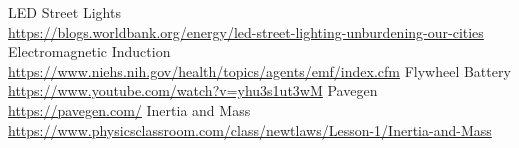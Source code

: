 \documentclass[11pt]{article}
\begin{document}
\pagebreak
\begin{thebibliography}{}
	
LED Street Lights\\
\url{https://blogs.worldbank.org/energy/led-street-lighting-unburdening-our-cities}	
Electromagnetic Induction\\
\url{https://www.niehs.nih.gov/health/topics/agents/emf/index.cfm}	
Flywheel Battery\\
\url{https://www.youtube.com/watch?v=yhu3s1ut3wM}	
Pavegen\\
\url{https://pavegen.com/}	
Inertia and Mass\\
\url{https://www.physicsclassroom.com/class/newtlaws/Lesson-1/Inertia-and-Mass}	
















\end{thebibliography}
	
	
\end{document}
